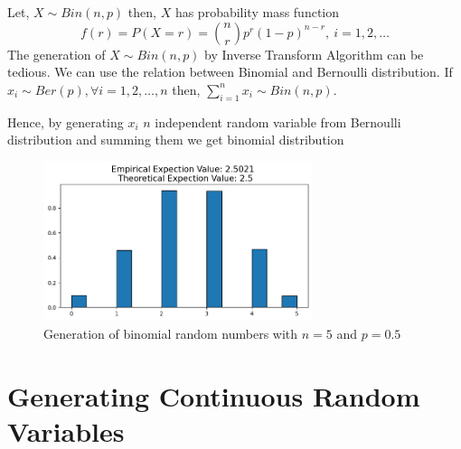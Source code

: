 \begin{example}
   Let, $X\sim Bin(n,p)$ then,  $X$ has probability mass function
   \[
       f(r) = P(X=r) = {n\choose r}p^{r}(1-p)^{n-r},\  i = 1,2, \ldots 
   \] 
   The generation of $X\sim Bin(n,p)$ by Inverse Transform Algorithm can be tedious. We can use the relation between Binomial and Bernoulli distribution.
   If $x_i \sim Ber(p), \forall i = 1,2, \ldots, n$ then, $\sum_{i=1}^{n} x_i\sim Bin(n,p)$.

   Hence, by generating $x_i$ $n$ independent random variable from Bernoulli distribution and summing them we get binomial distribution
   \begin{figure}[H]
       \centering
       \includegraphics[width=0.7\textwidth]{images/bin_ITA.png}
       \caption{Generation of  binomial random numbers with $n=5$ and  $p=0.5$}
   \end{figure}
\end{example}

\section{Generating Continuous Random Variables}

